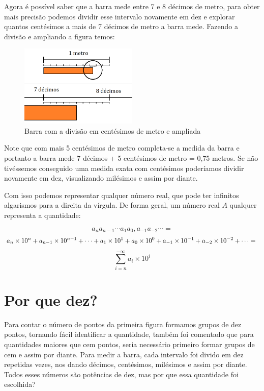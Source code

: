 \documentclass{report}
\theoremstyle{definition}
\begin{document}
Agora é possível saber que a barra mede entre 7 e 8 décimos de metro, para obter mais precisão podemos dividir esse intervalo novamente em dez e explorar quantos centésimos a mais de 7 décimos de metro a barra mede. Fazendo a divisão e ampliando a figura temos:

\begin{figure}[H]
    \centering
    \includegraphics[width=0.5\textwidth]{imgs/barra_3.png}
    \caption{Barra com a divisão em centésimos de metro e ampliada}
\end{figure}

Note que com mais 5 centésimos de metro completa-se a medida da barra e portanto a barra mede 7 décimos + 5 centésimos de metro = 0,75 metros. Se não tivéssemos conseguido uma medida exata com centésimos poderíamos dividir novamente em dez, visualizando milésimos e assim por diante.

Com isso podemos representar qualquer número real, que pode ter infinitos algarismos para a direita da vírgula. De forma geral, um número real $A$ qualquer representa a quantidade:

\begin{equation*}
a_n a_{n-1} \cdots a_1 a_0 , a_{-1} a_{-2} \cdots =
\end{equation*}
\begin{equation*}
a_{n} \times 10^{n} + a_{n-1} \times 10^{n-1} + \cdots + a_{1} \times 10^1 + a_{0} \times 10^0 + a_{-1} \times 10^{-1} + a_{-2} \times 10^{-2} + \cdots= \notag\\
\end{equation*}
\begin{equation}
\sum_{i=n}^{-\infty}a_i \times 10^i
\end{equation}

\section{Por que dez?}

Para contar o número de pontos da primeira figura formamos grupos de dez pontos, tornando fácil identificar a quantidade, também foi comentado que para quantidades maiores que cem pontos, seria necessário primeiro formar grupos de cem e assim por diante. Para medir a barra, cada intervalo foi divido em dez repetidas vezes, nos dando décimos, centésimos, milésimos e assim por diante. Todos esses números são potências de dez, mas por que essa quantidade foi escolhida?
\end{document}
